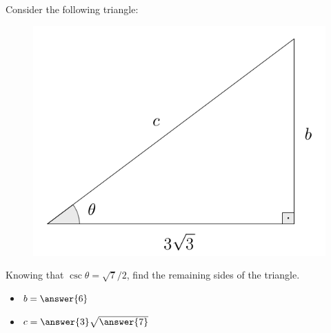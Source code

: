 \documentclass{ximera}
\author{Ivo Terek}
\begin{document}
\begin{exercise}
    
  Consider the following triangle:

  \begin{figure}[h]
    \centering
    \includegraphics[scale=.3]{RTT8-fig.png}
\end{figure}
  
  Knowing that $\csc\theta = \sqrt{7}/2$, find the remaining sides of the triangle.

  \begin{itemize}
  \item $b = \answer{6}$ 
  \item $c = \answer{3}\sqrt{\answer{7}}$
  \end{itemize}
\end{exercise}
\end{document}
